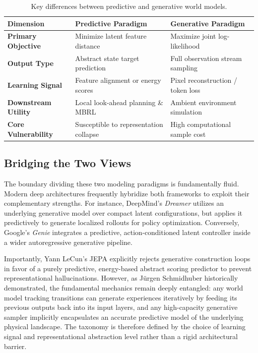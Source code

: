 \documentclass{tufte-handout}
\begin{document}
\begin{table}[htbp]
\centering
\small
\begin{tabular}{l p{3.2cm} p{3.2cm}}
\toprule
\textbf{Dimension} & \textbf{Predictive Paradigm} & \textbf{Generative Paradigm} \\
\midrule
\textbf{Primary Objective} & Minimize latent feature distance & Maximize joint log-likelihood \\
\textbf{Output Type} & Abstract state target prediction & Full observation stream sampling \\
\textbf{Learning Signal} & Feature alignment or energy scores & Pixel reconstruction / token loss \\
\textbf{Downstream Utility} & Local look-ahead planning \& MBRL & Ambient environment simulation \\
\textbf{Core Vulnerability} & Susceptible to representation collapse & High computational sample cost \\
\bottomrule
\end{tabular}
\caption{Key differences between predictive and generative world models.}
\label{tab:paradigms}
\end{table}

\subsection{Bridging the Two Views}

The boundary dividing these two modeling paradigms is fundamentally fluid. Modern deep architectures frequently hybridize both frameworks to exploit their complementary strengths. 
For instance, DeepMind's \textit{Dreamer} utilizes an underlying generative model over compact latent configurations, but applies it predictively to generate localized 
rollouts for policy optimization. Conversely, Google's \textit{Genie} integrates a predictive, action-conditioned latent controller inside a wider autoregressive generative pipeline.

Importantly, Yann LeCun's JEPA explicitly rejects generative construction loops in favor of a purely predictive, energy-based abstract scoring predictor to prevent representational
hallucinations. However, as Jürgen Schmidhuber historically demonstrated, the fundamental mechanics remain deeply entangled: any world model tracking transitions can generate 
experiences iteratively by feeding its previous outputs back into its input layers, and any high-capacity generative sampler implicitly encapsulates an accurate predictive 
model of the underlying physical landscape. The taxonomy is therefore defined by the choice of learning signal and representational abstraction level 
rather than a rigid architectural barrier.
\end{document}
